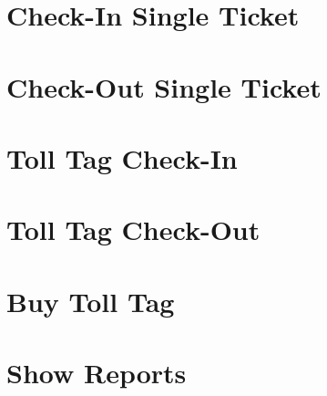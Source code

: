 \section{Check-In Single Ticket}


\section{Check-Out Single Ticket}


\section{Toll Tag Check-In}


\section{Toll Tag Check-Out}


\section{Buy Toll Tag}


\section{Show Reports}
